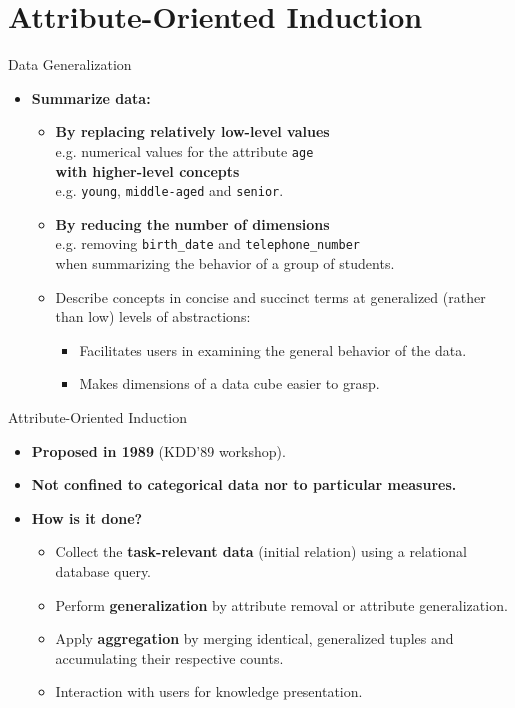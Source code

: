 \section{Attribute-Oriented Induction}

\begin{frame}{Data Generalization}
	\begin{itemize}
		\item \textbf{Summarize data:}
		      \begin{itemize}
			      \item \textbf{By replacing relatively low-level values} \\
			            e.g. numerical values for the attribute \texttt{age} \\
			            \textbf{with higher-level concepts}\\
			            e.g. \texttt{young}, \texttt{middle-aged} and \texttt{senior}.
			      \item \textbf{By reducing the number of dimensions}\\
			            e.g. removing \texttt{birth\_date} and \texttt{telephone\_number} \\ when summarizing the behavior of a group of students.
			      \item Describe concepts in concise and succinct terms at generalized (rather than low) levels of abstractions:
			            \begin{itemize}
				            \item Facilitates users in examining the general behavior of the data.
				            \item Makes dimensions of a data cube easier to grasp.
			            \end{itemize}
		      \end{itemize}
	\end{itemize}
\end{frame}

\begin{frame}{Attribute-Oriented Induction}
	\begin{itemize}
		\item \textbf{Proposed in 1989} (KDD'89 workshop).
		\item \textbf{Not confined to categorical data nor to particular measures.}
		\item \textbf{How is it done?}
		      \begin{itemize}
			      \item Collect the \textbf{\color{airforceblue}task-relevant data} (initial relation) using a relational database query.
			      \item Perform \textbf{\color{airforceblue}generalization} by attribute removal or attribute generalization.
			      \item Apply \textbf{\color{airforceblue}aggregation} by merging identical, generalized tuples and \\ accumulating their respective counts.
			      \item Interaction with users for knowledge presentation.
		      \end{itemize}
	\end{itemize}
\end{frame}

